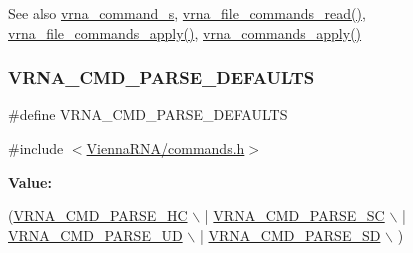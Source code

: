 \begin{DoxySeeAlso}{See also}
\mbox{\hyperlink{group__file__utils_structvrna__command__s}{vrna\+\_\+command\+\_\+s}}, \mbox{\hyperlink{group__file__utils_ga5d2a64331cff5b1059e7d327545d8a63}{vrna\+\_\+file\+\_\+commands\+\_\+read()}}, \mbox{\hyperlink{group__file__utils_gadbe8c9622f7bcc6dcbe3448b98df8656}{vrna\+\_\+file\+\_\+commands\+\_\+apply()}}, \mbox{\hyperlink{group__file__utils_ga5e993fc4b9602af73aaaab4d3b3cd9a9}{vrna\+\_\+commands\+\_\+apply()}} 
\end{DoxySeeAlso}
\mbox{\label{group__file__utils_ga0a6c88e21e366dca14958d69cd024008}} 
\subsubsection{\texorpdfstring{V\+R\+N\+A\+\_\+\+C\+M\+D\+\_\+\+P\+A\+R\+S\+E\+\_\+\+D\+E\+F\+A\+U\+L\+TS}{VRNA\_CMD\_PARSE\_DEFAULTS}}
{\footnotesize\ttfamily \#define V\+R\+N\+A\+\_\+\+C\+M\+D\+\_\+\+P\+A\+R\+S\+E\+\_\+\+D\+E\+F\+A\+U\+L\+TS}



{\ttfamily \#include $<$\mbox{\hyperlink{commands_8h}{Vienna\+R\+N\+A/commands.\+h}}$>$}

{\bfseries Value\+:}
\begin{DoxyCode}
(\mbox{\hyperlink{group__file__utils_gac54dec838d7b6bebd5df85f71702d324}{VRNA\_CMD\_PARSE\_HC}} \(\backslash\)
                                 | \mbox{\hyperlink{group__file__utils_ga8cad3c1f83e6f149829c49a186a83e21}{VRNA\_CMD\_PARSE\_SC}} \(\backslash\)
                                 | \mbox{\hyperlink{group__file__utils_ga6c6409780698826b04ebfed9151d7649}{VRNA\_CMD\_PARSE\_UD}} \(\backslash\)
                                 | \mbox{\hyperlink{group__file__utils_gaf5e20210173cdb83bf70256a454f284b}{VRNA\_CMD\_PARSE\_SD}} \(\backslash\)
                                 )
\end{DoxyCode}


